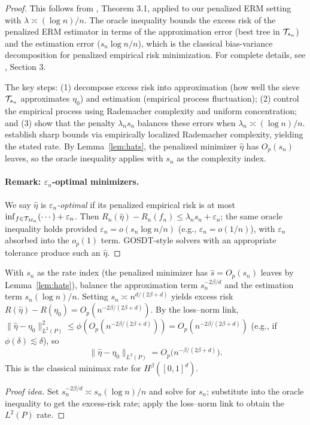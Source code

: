 \documentclass[12pt]{article}
\begin{document}
\begin{proof}
This follows from \citet{xuStatisticalOptimalityOptimal2026}, Theorem 3.1, applied to our penalized ERM setting with $\lambda \asymp (\log n)/n$. The oracle inequality bounds the excess risk of the penalized ERM estimator in terms of the approximation error (best tree in $\mathcal{T}_{s_n}$) and the estimation error ($s_n \log n / n$), which is the classical bias-variance decomposition for penalized empirical risk minimization. For complete details, see \citet{xuStatisticalOptimalityOptimal2026}, Section 3.

The key steps: (1) decompose excess risk into approximation (how well the sieve $\mathcal{T}_{s_n}$ approximates $\eta_0$) and estimation (empirical process fluctuation); (2) control the empirical process using Rademacher complexity and uniform concentration; and (3) show that the penalty $\lambda_n s_n$ balances these errors when $\lambda_n \asymp (\log n)/n$. \citet{xuStatisticalOptimalityOptimal2026} establish sharp bounds via empirically localized Rademacher complexity, yielding the stated rate. By Lemma~\ref{lem:hats}, the penalized minimizer $\hat\eta$ has $O_p(s_n)$ leaves, so the oracle inequality applies with $s_n$ as the complexity index.

\paragraph{Remark: $\varepsilon_n$-optimal minimizers.}
We say $\hat\eta$ is \emph{$\varepsilon_n$-optimal} if its penalized empirical risk is at most $\inf_{f \in \mathcal{T}_{M_n}}(\cdots) + \varepsilon_n$. Then $R_n(\hat\eta) - R_n(f_n) \le \lambda_n s_n + \varepsilon_n$; the same oracle inequality holds provided $\varepsilon_n = o(s_n \log n / n)$ (e.g., $\varepsilon_n = o(1/n)$), with $\varepsilon_n$ absorbed into the $o_p(1)$ term. GOSDT-style solvers with an appropriate tolerance produce such an $\hat\eta$.
\end{proof}

\begin{lemma}
\label{lem:optimal-sn}
With $s_n$ as the rate index (the penalized minimizer has $\hat{s} = O_p(s_n)$ leaves by Lemma~\ref{lem:hats}), balance the approximation term $s_n^{-2\beta/d}$ and the estimation term $s_n (\log n)/n$. Setting $s_n \asymp n^{d/(2\beta+d)}$ yields excess risk $R(\hat\eta) - R(\eta_0) = O_p(n^{-2\beta/(2\beta+d)})$. By the loss--norm link, $\|\hat\eta - \eta_0\|_{L^2(P)}^2 \le \phi(O_p(n^{-2\beta/(2\beta+d)})) = O_p(n^{-2\beta/(2\beta+d)})$ (e.g., if $\phi(\delta) \lesssim \delta$), so
\[
\|\hat\eta - \eta_0\|_{L^2(P)} = O_p\bigl( n^{-\beta/(2\beta+d)} \bigr).
\]
This is the classical minimax rate for $H^\beta([0,1]^d)$.
\end{lemma}
\begin{proof}[Proof idea]
Set $s_n^{-2\beta/d} \asymp s_n (\log n)/n$ and solve for $s_n$; substitute into the oracle inequality to get the excess-risk rate; apply the loss--norm link to obtain the $L^2(P)$ rate.
\end{proof}
\end{document}
